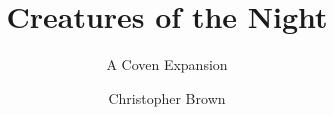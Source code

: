 \documentclass[a4paper,10pt,twocolumn]{memoir}
\title{Creatures of the Night}
\subtitle{A Coven Expansion}
\author{Christopher Brown}
\begin{document}
\frontmatter

\titlepage



\tableofcontents*

\mainmatter



\backmatter

\printindex
\end{document}

